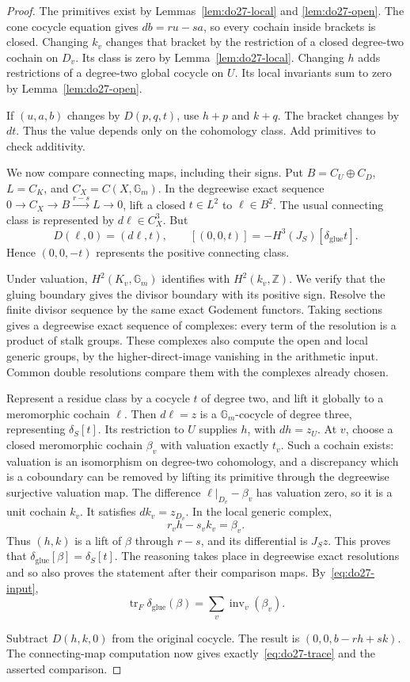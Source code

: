 \begin{proof}
The primitives exist by Lemmas~\ref{lem:do27-local} and
\ref{lem:do27-open}. The cone cocycle equation gives
\(db=ru-sa\), so every cochain inside brackets is closed.
Changing \(k_v\) changes that bracket by the restriction of a
closed degree-two cochain on \(D_v\). Its class is zero by
Lemma~\ref{lem:do27-local}. Changing \(h\) adds restrictions of a
degree-two global cocycle on \(U\). Its local invariants sum to zero
by Lemma~\ref{lem:do27-open}.

If \((u,a,b)\) changes by \(D(p,q,t)\), use \(h+p\) and \(k+q\).
The bracket changes by \(dt\). Thus the value depends only on the
cohomology class. Add primitives to check additivity.

We now compare connecting maps, including their signs. Put
\(B=C_U\oplus C_D\), \(L=C_K\), and
\(C_X=C(X,\mathbb G_m)\). In the degreewise exact
sequence \(0\to C_X\to B\xrightarrow{r-s}L\to0\), lift a
closed \(t\in L^2\) to \(\ell\in B^2\).
The usual connecting class is represented by \(d\ell\in C_X^3\).
But
\[
 D(\ell,0)=(d\ell,t),\qquad
 [(0,0,t)]=-H^3(J_S)[\delta_{\mathrm{glue}}t].
\]
Hence \((0,0,-t)\) represents the positive connecting class.

Under valuation, \(H^2(K_v,\mathbb G_m)\) identifies with
\(H^2(k_v,\mathbb Z)\). We verify that the gluing boundary gives
the divisor boundary with its positive sign. Resolve the finite divisor
sequence by the same exact Godement functors. Taking sections gives
a degreewise exact sequence of complexes: every term of the
resolution is a product of stalk groups. These complexes also
compute the open and local generic groups, by the higher-direct-image
vanishing in the arithmetic input. Common double resolutions compare
them with the complexes already chosen.

Represent a residue class by a cocycle \(t\) of degree two, and
lift it globally to a meromorphic cochain \(\ell\).
Then \(d\ell=z\) is a \(\mathbb G_m\)-cocycle of degree three,
representing \(\delta_S[t]\). Its restriction to \(U\) supplies
\(h\), with \(dh=z_U\). At \(v\), choose a closed meromorphic
cochain \(\beta_v\) with valuation exactly \(t_v\).
Such a cochain exists: valuation is an isomorphism on degree-two
cohomology, and a discrepancy which is a coboundary can be removed
by lifting its primitive through the degreewise surjective valuation
map. The difference \(\ell|_{D_v}-\beta_v\) has valuation zero,
so it is a unit cochain \(k_v\). It satisfies \(dk_v=z_{D_v}\).
In the local generic complex,
\[
 r_vh-s_vk_v=\beta_v.
\]
Thus \((h,k)\) is a lift of \(\beta\) through \(r-s\), and
its differential is \(J_Sz\). This proves that
\(\delta_{\mathrm{glue}}[\beta]=\delta_S[t]\).
The reasoning takes place in degreewise exact resolutions and so
also proves the statement after their comparison maps. By~\eqref{eq:do27-input},
\[
 \operatorname{tr}_F\delta_{\mathrm{glue}}(\beta)
     =\sum_v\operatorname{inv}_v(\beta_v).
\]

Subtract \(D(h,k,0)\) from the original cocycle. The result is
\((0,0,b-rh+sk)\). The connecting-map computation now gives
exactly~\eqref{eq:do27-trace} and the asserted comparison.
\end{proof}

